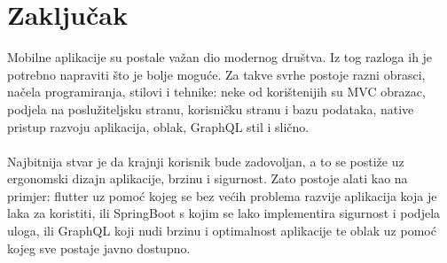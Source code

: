 \documentclass[times, utf8, zavrsni]{fer}
\begin{document}
\chapter{Zaključak}
Mobilne aplikacije su postale važan dio modernog društva. Iz tog razloga ih je potrebno napraviti što je
bolje moguće. Za takve svrhe postoje razni obrasci, načela programiranja, stilovi i tehnike: neke od
korištenijih su MVC obrazac, podjela na poslužiteljsku stranu, korisničku stranu i bazu podataka,
native pristup razvoju aplikacija, oblak, GraphQL stil i slično.
\\\\
Najbitnija stvar je da krajnji korisnik bude zadovoljan, a to se postiže uz ergonomski dizajn aplikacije,
brzinu i sigurnost. Zato postoje alati kao na primjer: flutter uz pomoć kojeg se bez većih problema razvije aplikacija koja
je laka za koristiti, ili SpringBoot s kojim se lako implementira sigurnost i podjela uloga, ili GraphQL koji
nudi brzinu i optimalnost aplikacije te oblak uz pomoć kojeg sve postaje javno dostupno.



\nocite{ProgramiranjeUJavi}
\nocite{GraphQL}
\nocite{Authentication}
\nocite{Spring}
\end{document}

